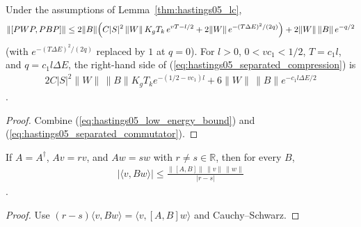 \begin{lemma}
    \label{thm:hastings05_blecm}
    \leanok
    Under the assumptions of Lemma~\ref{thm:hastings05_lc},
    \begin{align}
        \|[PWP,PBP]\|\le2\|B\|\Bigl(C|S|^2\,\|W\|\,K_gT_k\,e^{vT-l/2}
        +2\|W\|\,e^{-(T\Delta E)^2/(2q)}\Bigr)+2\|W\|\,\|B\|\,e^{-q/2}
        \label{eq:hastings05_separated_compression}
    \end{align}
    (with $e^{-(T\Delta E)^2/(2q)}$ replaced by $1$ at $q=0$). For $l>0$,
    $0<vc_1<1/2$, $T=c_1l$, and $q=c_1l\Delta E$, the right-hand side of
    (\ref{eq:hastings05_separated_compression}) is
    \begin{align}
        2C|S|^2\|W\|\,\|B\|K_gT_k e^{-(1/2-vc_1)l}
        +6\|W\|\,\|B\|e^{-c_1l\Delta E/2}
        \label{eq:hastings05_exponential_commutator_decay}
    \end{align}
    \cite[lines 1562--1601]{Hastings2006Solving}.
\end{lemma}
\begin{proof}\leanok
    Combine (\ref{eq:hastings05_low_energy_bound}) and
    (\ref{eq:hastings05_separated_commutator}).
\end{proof}

\begin{lemma}
    \label{thm:hastings05_offdiagonal_commutator}
    \leanok
    If $A=A^\dagger$, $Av=rv$, and $Aw=sw$ with $r\ne s\in\mathbb R$, then for
    every $B$,
    \begin{align}
        |\langle v,Bw\rangle|\le\frac{\|[A,B]\|\,\|v\|\,\|w\|}{|r-s|}
        \label{eq:hastings05_offdiagonal_bound}
    \end{align}
    \cite[lines 1678--1690]{Hastings2006Solving}.
\end{lemma}
\begin{proof}\leanok
    Use $(r-s)\langle v,Bw\rangle=\langle v,[A,B]w\rangle$ and Cauchy--Schwarz.
\end{proof}


